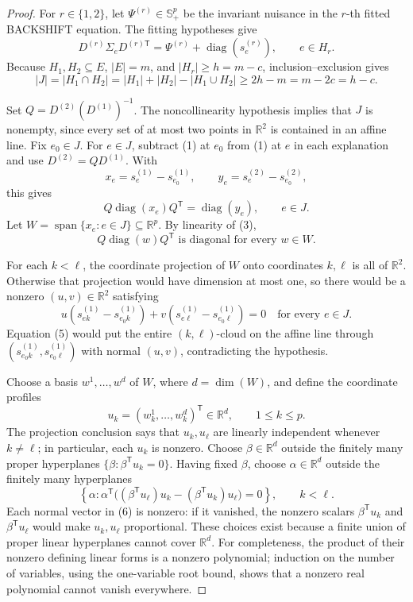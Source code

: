 \documentclass{article}
\begin{document}
\begin{proof}
For \(r\in\{1,2\}\), let \(\Psi^{(r)}\in\mathbb S_+^p\) be the invariant nuisance in the \(r\)-th fitted BACKSHIFT equation.  The fitting hypotheses give
\[
 D^{(r)}\Sigma_eD^{(r)\mathsf T}
 =\Psi^{(r)}+\operatorname{diag}(s^{(r)}_e),
 \qquad e\in H_r.
 \tag{1}
\]
Because \(H_1,H_2\subseteq E\), \(|E|=m\), and \(|H_r|\ge h=m-c\), inclusion--exclusion gives
\[
 |J|=|H_1\cap H_2|
 =|H_1|+|H_2|-|H_1\cup H_2|
 \ge 2h-m=m-2c=h-c.
 \tag{2}
\]

Set \(Q=D^{(2)}(D^{(1)})^{-1}\).  The noncollinearity hypothesis implies that \(J\) is nonempty, since every set of at most two points in \(\mathbb R^2\) is contained in an affine line.  Fix \(e_0\in J\).  For \(e\in J\), subtract (1) at \(e_0\) from (1) at \(e\) in each explanation and use \(D^{(2)}=QD^{(1)}\).  With
\[
 x_e=s^{(1)}_e-s^{(1)}_{e_0},
 \qquad
 y_e=s^{(2)}_e-s^{(2)}_{e_0},
\]
this gives
\[
 Q\operatorname{diag}(x_e)Q^{\mathsf T}
 =\operatorname{diag}(y_e),
 \qquad e\in J.
 \tag{3}
\]
Let \(W=\operatorname{span}\{x_e:e\in J\}\subseteq\mathbb R^p\).  By linearity of (3),
\[
 Q\operatorname{diag}(w)Q^{\mathsf T}
 \text{ is diagonal for every }w\in W.
 \tag{4}
\]

For each \(k<\ell\), the coordinate projection of \(W\) onto coordinates \(k,\ell\) is all of \(\mathbb R^2\).  Otherwise that projection would have dimension at most one, so there would be a nonzero \((u,v)\in\mathbb R^2\) satisfying
\[
 u(s^{(1)}_{ek}-s^{(1)}_{e_0k})
 +v(s^{(1)}_{e\ell}-s^{(1)}_{e_0\ell})=0
 \quad\text{for every }e\in J.
 \tag{5}
\]
Equation (5) would put the entire \((k,\ell)\)-cloud on the affine line through \((s^{(1)}_{e_0k},s^{(1)}_{e_0\ell})\) with normal \((u,v)\), contradicting the hypothesis.

Choose a basis \(w^1,\ldots,w^d\) of \(W\), where \(d=\dim(W)\), and define the coordinate profiles
\[
 u_k=(w^1_k,\ldots,w^d_k)^{\mathsf T}\in\mathbb R^d,
 \qquad 1\le k\le p.
\]
The projection conclusion says that \(u_k,u_\ell\) are linearly independent whenever \(k\ne\ell\); in particular, each \(u_k\) is nonzero.  Choose \(\beta\in\mathbb R^d\) outside the finitely many proper hyperplanes \(\{\beta:\beta^{\mathsf T}u_k=0\}\).  Having fixed \(\beta\), choose \(\alpha\in\mathbb R^d\) outside the finitely many hyperplanes
\[
 \left\{\alpha:
 \alpha^{\mathsf T}\bigl((\beta^{\mathsf T}u_\ell)u_k
 -(\beta^{\mathsf T}u_k)u_\ell\bigr)=0\right\},
 \qquad k<\ell.
 \tag{6}
\]
Each normal vector in (6) is nonzero: if it vanished, the nonzero scalars \(\beta^{\mathsf T}u_k\) and \(\beta^{\mathsf T}u_\ell\) would make \(u_k,u_\ell\) proportional.  These choices exist because a finite union of proper linear hyperplanes cannot cover \(\mathbb R^d\).  For completeness, the product of their nonzero defining linear forms is a nonzero polynomial; induction on the number of variables, using the one-variable root bound, shows that a nonzero real polynomial cannot vanish everywhere.


\end{proof}
\end{document}
